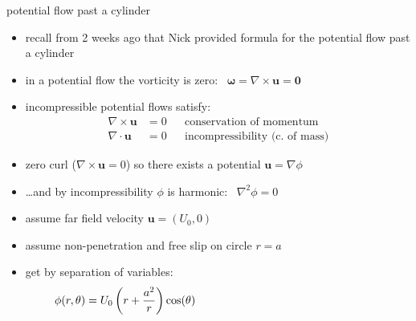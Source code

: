 \documentclass[10pt,hyperref,colorlinks]{beamer}
\newcommand{\bu}{\mathbf{u}}
\newcommand{\bzero}{\bm{0}}
\newcommand{\grad}{\nabla}
\newcommand{\Div}{\nabla\cdot}
\newcommand{\Curl}{\nabla\times}
\begin{document}
\begin{frame}{potential flow past a cylinder}

\begin{itemize}
\item recall from 2 weeks ago that Nick provided formula for the potential flow past a cylinder
\item in a \alert{potential flow} the vorticity is zero: \, $\bm{\omega}=\Curl\bu=\bzero$
\item incompressible potential flows satisfy:
\begin{align*}
\Curl \bu &= 0 & &\text{conservation of momentum} \\
\Div \bu &= 0 & &\text{incompressibility (c.~of mass)}
\end{align*}
\item zero curl ($\Curl\bu=0$) so there exists a potential $\bu = \grad \phi$
\item \dots and by incompressibility $\phi$ is harmonic: \, $\grad^2 \phi = 0$
\item assume far field velocity $\bu=(U_0,0)$
\item assume non-penetration and free slip on circle $r=a$
\item get by separation of variables:
	$$\phi(r,\theta) = U_0 \left(r + \frac{a^2}{r}\right) \cos(\theta) \hspace{2.3in}$$
\end{itemize}
\end{frame}
\end{document}
